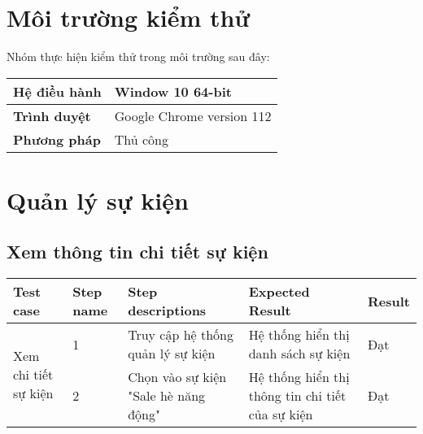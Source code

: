 \section{Môi trường kiểm thử}

\hspace*{0.5cm}Nhóm thực hiện kiểm thử trong môi trường sau đây:
\\
{
    \setlength\extrarowheight{6pt}
    \begin{longtable}{| p{} | p{} |}
        \hline
        \textbf{Hệ điều hành} & Window 10 64-bit \\
        \hline
        \textbf{Trình duyệt} & Google Chrome version 112\\
        \hline
        \textbf{Phương pháp} & Thủ công\\
         \hline
    \end{longtable} 
}


\section{Quản lý sự kiện}

\subsection{Xem thông tin chi tiết sự kiện}
{
    \setlength\extrarowheight{6pt}
    \begin{longtable}{| p{2.5cm}| p{1cm}| p{5.5cm}| p{4.5cm} | p{1.5cm} |}
        \hline
        \textbf{Test case} & \textbf{Step name} & \textbf{Step descriptions} & \textbf{Expected Result} & \textbf{Result} \\
        \hline
        \multirow[c]{2}{2.5cm}{Xem chi tiết sự kiện} & 1 & Truy cập hệ thống quản lý sự kiện & Hệ thống hiển thị danh sách sự kiện & Đạt \\
        \cline{2-5}
         & 2 & Chọn vào sự kiện "Sale hè năng động" & Hệ thống hiển thị thông tin chi tiết của sự kiện & Đạt \\
         \hline
    \end{longtable}
}

